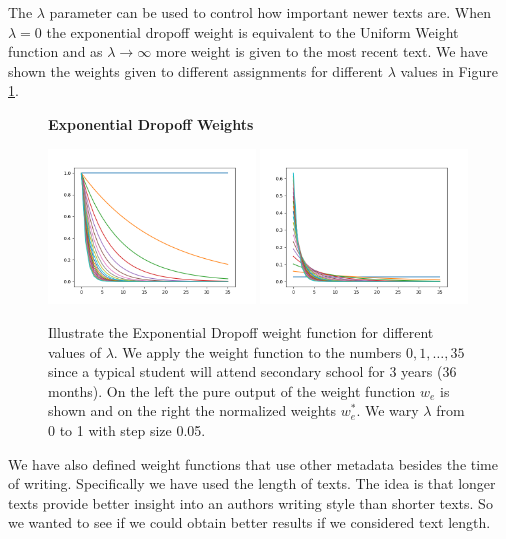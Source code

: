 The $\lambda$ parameter can be used to control how important newer texts are.
When $\lambda = 0$ the exponential dropoff weight is equivalent to the Uniform
Weight function and as $\lambda \rightarrow \infty$ more weight is given to the
most recent text. We have shown the weights given to different assignments for
different $\lambda$ values in Figure \ref{fig:weights}.

\begin{figure}
    \centering
    \textbf{Exponential Dropoff Weights}\par\medskip
    \includegraphics[width=0.49\textwidth]{./pictures/method/weights.png}
    \includegraphics[width=0.49\textwidth]{./pictures/method/weights_normalized.png}
    \caption{Illustrate the Exponential Dropoff weight function for different
        values of $\lambda$. We apply the weight function to the numbers $0, 1,
        \dots, 35$ since a typical student will attend secondary school for 3
        years (36 months). On the left the pure output of the weight function
        $w_e$ is shown and on the right the normalized weights $w_e^*$. We wary
        $\lambda$ from 0 to 1 with step size 0.05.}
    \label{fig:weights}
\end{figure}

We have also defined weight functions that use other metadata besides the time
of writing. Specifically we have used the length of texts. The idea is that
longer texts provide better insight into an authors writing style than shorter
texts. So we wanted to see if we could obtain better results if we considered
text length.

